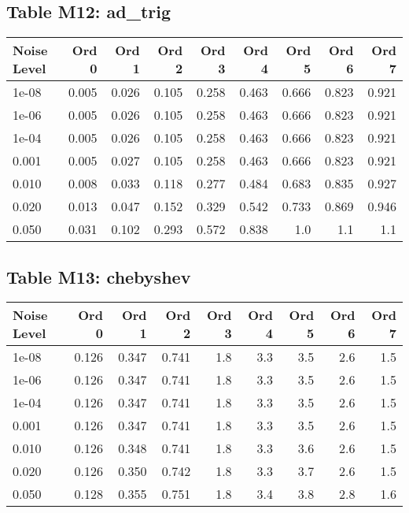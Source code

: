 \clearpage

\subsection*{Table M12: ad\_trig}

\begin{longtable}{lrrrrrrrr}
\toprule
\textbf{Noise Level} & \textbf{Ord 0} & \textbf{Ord 1} & \textbf{Ord 2} & \textbf{Ord 3} & \textbf{Ord 4} & \textbf{Ord 5} & \textbf{Ord 6} & \textbf{Ord 7} \\
\midrule
\endhead
1e-08 & 0.005 & 0.026 & 0.105 & 0.258 & 0.463 & 0.666 & 0.823 & 0.921 \\
1e-06 & 0.005 & 0.026 & 0.105 & 0.258 & 0.463 & 0.666 & 0.823 & 0.921 \\
1e-04 & 0.005 & 0.026 & 0.105 & 0.258 & 0.463 & 0.666 & 0.823 & 0.921 \\
0.001 & 0.005 & 0.027 & 0.105 & 0.258 & 0.463 & 0.666 & 0.823 & 0.921 \\
0.010 & 0.008 & 0.033 & 0.118 & 0.277 & 0.484 & 0.683 & 0.835 & 0.927 \\
0.020 & 0.013 & 0.047 & 0.152 & 0.329 & 0.542 & 0.733 & 0.869 & 0.946 \\
0.050 & 0.031 & 0.102 & 0.293 & 0.572 & 0.838 & 1.0 & 1.1 & 1.1 \\
\bottomrule
\end{longtable}

\clearpage

\subsection*{Table M13: chebyshev}

\begin{longtable}{lrrrrrrrr}
\toprule
\textbf{Noise Level} & \textbf{Ord 0} & \textbf{Ord 1} & \textbf{Ord 2} & \textbf{Ord 3} & \textbf{Ord 4} & \textbf{Ord 5} & \textbf{Ord 6} & \textbf{Ord 7} \\
\midrule
\endhead
1e-08 & 0.126 & 0.347 & 0.741 & 1.8 & 3.3 & 3.5 & 2.6 & 1.5 \\
1e-06 & 0.126 & 0.347 & 0.741 & 1.8 & 3.3 & 3.5 & 2.6 & 1.5 \\
1e-04 & 0.126 & 0.347 & 0.741 & 1.8 & 3.3 & 3.5 & 2.6 & 1.5 \\
0.001 & 0.126 & 0.347 & 0.741 & 1.8 & 3.3 & 3.5 & 2.6 & 1.5 \\
0.010 & 0.126 & 0.348 & 0.741 & 1.8 & 3.3 & 3.6 & 2.6 & 1.5 \\
0.020 & 0.126 & 0.350 & 0.742 & 1.8 & 3.3 & 3.7 & 2.6 & 1.5 \\
0.050 & 0.128 & 0.355 & 0.751 & 1.8 & 3.4 & 3.8 & 2.8 & 1.6 \\
\bottomrule
\end{longtable}

